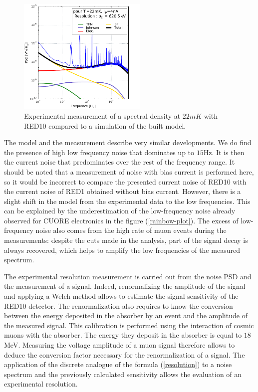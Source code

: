 \begin{figure}[!ht]
\begin{center}
\includegraphics[width=0.55\textwidth]{Figures/Ethem/modexp.pdf}
\end{center}
\caption{Experimental measurement of a spectral density at $22 mK$ with RED10 compared to a simulation of the built model.}
\label{noise-red10}
\end{figure}

The model and the measurement describe very similar developments. We do find the presence of high low frequency noise that dominates up to $15$Hz. It is then the current noise that predominates over the rest of the frequency range. It should be noted that a measurement of noise with bias current is performed here, so it would be incorrect to compare the presented current noise of RED10 with the current noise of RED1 obtained without bias current. However, there is a slight shift in the model from the experimental data to the low frequencies. This can be explained by the underestimation of the low-frequency noise already observed for CUORE electronics in the figure (\ref{rainbow-plot}). The excess of low-frequency noise also comes from the high rate of muon events during the measurements: despite the cuts made in the analysis, part of the signal decay is always recovered, which helps to amplify the low frequencies of the measured spectrum.

The experimental resolution measurement is carried out from the noise PSD and the measurement of a signal. Indeed, renormalizing the amplitude of the signal and applying a Welch method allows to estimate the signal sensitivity of the RED10 detector. The renormalization also requires to know the conversion between the energy deposited in the absorber by an event and the amplitude of the measured signal. This calibration is performed using the interaction of cosmic muons with the absorber. The energy they deposit in the absorber is equal to $18$MeV. Measuring the voltage amplitude of a muon signal therefore allows to deduce the conversion factor necessary for the renormalization of a signal. The application of the discrete analogue of the formula (\ref{resolution}) to a noise spectrum and the previously calculated sensitivity allows the evaluation of an experimental resolution. 

